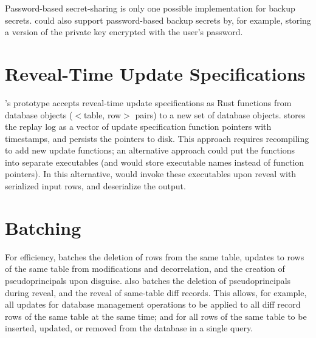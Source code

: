 
%
Password-based secret-sharing is only one possible implementation for backup
secrets. \sys could also support password-based backup secrets by, for example, storing a
version of the private key encrypted with the user's password.
%

\section{Reveal-Time Update Specifications}

\sys's prototype accepts reveal-time update specifications as Rust functions
from database objects ($<$table, row$>$ pairs) to a new set of database objects.
\sys stores the replay log as a vector of update specification function pointers with
timestamps, and persists the pointers to disk. This approach requires
recompiling \sys to add new update functions; an alternative approach could put
the functions into separate executables (and \sys would store executable names
instead of function pointers). In this alternative, \sys would invoke these
executables upon reveal with serialized input rows, and deserialize the output.

\section{Batching}
\label{s:impl:batching}

For efficiency, \sys batches the deletion of rows from the same table, updates
to rows of the same table from modifications and decorrelation, and the creation
of pseudoprincipals upon disguise. 
%
\sys also batches the deletion of pseudoprincipals during reveal, and 
the reveal of same-table diff records. This allows, for example, all updates for
database management operations to be applied to all diff record rows of the same
table at the same time; and for all rows of the same table to be inserted,
updated, or removed from the database in a single query.
%

